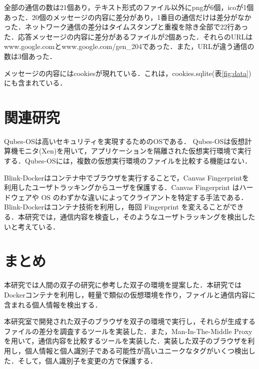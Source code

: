 \documentclass[submit,techrep]{ipsj}
\begin{document}
全部の通信の数は21個あり，テキスト形式のファイル以外にpngが6個，icoが1個あった．20個のメッセージの内容に差分があり，1番目の通信だけは差分がなかった．ネットワーク通信の差分はタイムスタンプと重複を除き全部で22行あった．応答メッセージの内容に差分があるファイルが2個あった．それらのURLはwww.google.comとwww.google.com/gen\_204であった．また，URLが違う通信の数は3個あった．

メッセージの内容にはcookiesが現れている．これは，cookies.sqlite(表\ref{fig:data})にも含まれている．




\section{関連研究}
Qubes-OS\cite{qubes}は高いセキュリティを実現するためのOSである． Qubes-OSは仮想計算機モニタ(Xen)を用いて，アプリケーションを隔離された仮想実行環境で実行する．Qubes-OSには，複数の仮想実行環境のファイルを比較する機能はない．

Blink-Docker\cite{blink}はコンテナ中でブラウザを実行することで，Canvas Fingerprintを利用したユーザトラッキングからユーザを保護する．Canvas Fingerprint はハードウェアや OS のわずかな違いによってクライアントを特定する手法である．Blink-Dockerはコンテナ技術を利用し，毎回 Fingerprint を変えることができる．本研究では，通信内容を検査し，そのようなユーザトラッキングを検出したいと考えている．



\section{まとめ}
本研究では人間の双子の研究に参考した双子の環境を提案した．本研究ではDockerコンテナを利用し，軽量で類似の仮想環境を作り，ファイルと通信内容に含まれる個人情報を検出する．

本研究室で開発された双子のブラウザを双子の環境で実行し，それらが生成するファイルの差分を調査するツールを実装した．また，Man-In-The-Middle Proxyを用いて，通信内容を比較するツールを実装した．実装した双子のブラウザを利用し，個人情報と個人識別子である可能性が高いユニークなタグがいくつ検出した．そして，個人識別子を変更の方で保護する．


\end{document}
